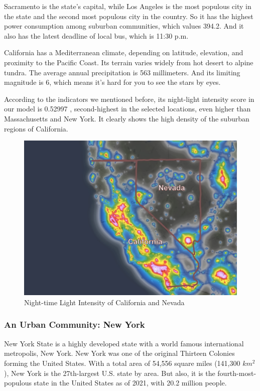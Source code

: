 Sacramento is the state's capital, while Los Angeles is the most populous city in the state and the second most populous city in the country. So it has the highest power consumption among suburban communities, which values 394.2. And it also has the latest deadline of local bus, which is 11:30 p.m.

California has a Mediterranean climate, depending on latitude, elevation, and proximity to the Pacific Coast. Its terrain varies widely from hot desert to alpine tundra. The average annual precipitation is 563 millimeters. And its limiting magnitude is 6, which means it's hard for you to see the stars by eyes.

According to the indicators we mentioned before, its night-light intensity score in our model is 0.52997
, second-highest in the selected locations, even higher than Massachusetts and New York. It clearly shows the high density of the suburban regions of California.

\begin{figure}[H]\centering
    \includegraphics[width=1\textwidth]{figures/texted/Nevada.jpg}
    \caption{Night-time Light Intensity of California and Nevada} \label{fig:figure4}
\end{figure}


\subsubsection{An Urban Community: New York}
New York State is a highly developed state with a world famous international metropolis, New York. New York was one of the original Thirteen Colonies forming the United States. With a total area of 54,556 square miles (141,300 $km^2$), New York is the 27th-largest U.S. state by area. But also, it is the fourth-most-populous state in the United States as of 2021, with 20.2 million people.

